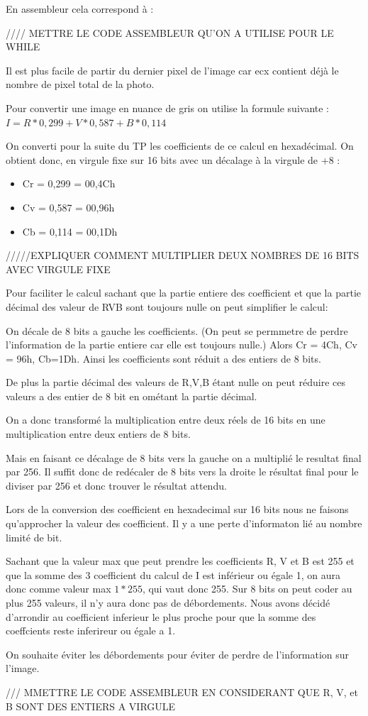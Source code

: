 \documentclass[11pt]{report}
\begin{document}
En assembleur cela correspond à :


//// METTRE LE CODE ASSEMBLEUR QU'ON A UTILISE POUR LE WHILE


Il est plus facile de partir du dernier pixel de l'image car ecx contient déjà le nombre de pixel total de la photo.

Pour convertir une image en nuance de gris on utilise la formule suivante :
$I=R*0,299+V*0,587+B*0,114$

On converti pour la suite du TP les coefficients de ce calcul en hexadécimal.
On obtient donc, en virgule fixe sur 16 bits avec un décalage à la virgule de +8 :
\begin{itemize}
\item  Cr = 0,299 =  00,4Ch
\item  Cv = 0,587 = 00,96h
\item  Cb = 0,114 = 00,1Dh
\end{itemize}

/////EXPLIQUER COMMENT MULTIPLIER DEUX NOMBRES DE 16 BITS AVEC VIRGULE FIXE

Pour faciliter le calcul sachant que la partie entiere des coefficient et que la partie décimal des valeur de RVB sont toujours nulle on peut simplifier le calcul:

On décale de 8 bits a gauche les coefficients. (On peut se permmetre de perdre l'information de la partie entiere car elle est toujours nulle.)
Alors Cr = 4Ch, Cv = 96h, Cb=1Dh.
Ainsi les coefficients sont réduit a des entiers de 8 bits.

De plus la partie décimal des valeurs de R,V,B étant nulle on peut réduire ces valeurs a des entier de 8 bit en ométant la partie décimal.

On a donc transformé la multiplication entre deux réels de 16 bits en une multiplication entre deux entiers de 8 bits.

Mais en faisant ce décalage de 8 bits vers la gauche on a multiplié le resultat final par 256.
Il suffit donc de redécaler de 8 bits vers la droite le résultat final pour le diviser par 256 et donc trouver le résultat attendu.


Lors de la conversion des coefficient en hexadecimal sur 16 bits nous ne faisons qu'approcher la valeur des coefficient. Il y a une perte d'informaton lié au nombre limité de bit.

Sachant que la valeur max que peut prendre les coefficients R, V et B est 255 et que la somme des 3 coefficient du calcul de I est inférieur ou égale 1, on aura donc comme valeur max $1*255$, qui vaut donc 255. Sur 8 bits on peut coder au plus 255 valeurs, il n'y aura donc pas de débordements.
Nous avons décidé d'arrondir au coefficient inferieur le plus proche pour que la somme des coeffcients reste inferireur ou égale a 1.

On souhaite éviter les débordements pour éviter de perdre de l'information sur l'image.

\medskip

/// MMETTRE LE CODE ASSEMBLEUR EN CONSIDERANT QUE R, V, et B SONT DES ENTIERS A VIRGULE
\end{document}
